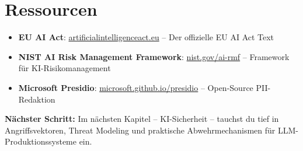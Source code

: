 \section{Ressourcen}

\begin{itemize}[leftmargin=*]
    \item \textbf{EU AI Act}: \href{https://artificialintelligenceact.eu}{artificialintelligenceact.eu} -- Der offizielle EU AI Act Text
    \item \textbf{NIST AI Risk Management Framework}: \href{https://www.nist.gov/ai-rmf}{nist.gov/ai-rmf} -- Framework für KI-Risikomanagement
    \item \textbf{Microsoft Presidio}: \href{https://microsoft.github.io/presidio}{microsoft.github.io/presidio} -- Open-Source PII-Redaktion
\end{itemize}

\textbf{Nächster Schritt:} Im nächsten Kapitel -- KI-Sicherheit -- tauchst du tief in Angriffsvektoren, Threat Modeling und praktische Abwehrmechanismen für LLM-Produktionssysteme ein.
